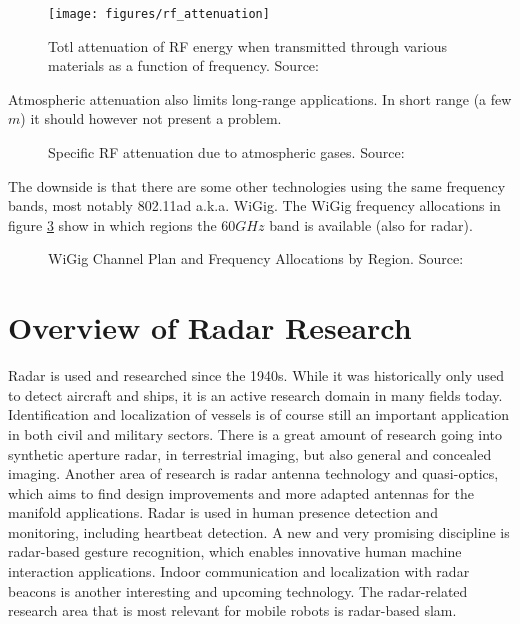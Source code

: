 \begin{figure}[htp]
    \centering
    \label{fig:attenuation}
    \texttt{[image: figures/rf\_attenuation]}
    \caption{Totl attenuation of RF energy when transmitted through various materials as a function of frequency. Source: \cite{FerrisJr.1998}}
\end{figure}

Atmospheric attenuation also limits long-range applications. In short
range (a few \(m\)) it should however not present a problem.

\begin{figure}[htp]
    \centering
    \label{fig:attenuation_air}
    \def\svgscale{1}
    
    \caption{Specific RF attenuation due to atmospheric gases. Source: \cite{ITU1997}}
\end{figure}

The downside is that there are some other technologies using the same
frequency bands, most notably 802.11ad a.k.a.
WiGig\cite{AgilentTechnologies2013}. The WiGig frequency allocations in
figure \ref{fig:wigig} show in which regions the \(60GHz\) band is available (also
for radar).

\begin{figure}[htp]
    \centering
    \label{fig:wigig}
    \def\svgwidth{\linewidth}
    
    \caption{WiGig Channel Plan and Frequency Allocations by Region. Source: \cite{AgilentTechnologies2013}}
\end{figure}

\section{Overview of Radar
Research}\label{overview-of-radar-research}

Radar is used and researched since the 1940s. While it was historically
only used to detect aircraft and ships, it is an active research domain
in many fields today. Identification and localization of vessels is of
course still an important application in both civil and military
sectors. There is a great amount of research going into synthetic
aperture radar, in terrestrial imaging, but also general and concealed
imaging. Another area of research is radar antenna technology and
quasi-optics, which aims to find design improvements and more adapted
antennas for the manifold applications. Radar is used in human presence
detection and monitoring, including heartbeat detection. A new and very
promising discipline is radar-based gesture recognition, which enables
innovative human machine interaction applications. Indoor communication
and localization with radar beacons is another interesting and upcoming
technology. The radar-related research area that is most relevant for
mobile robots is radar-based slam.

